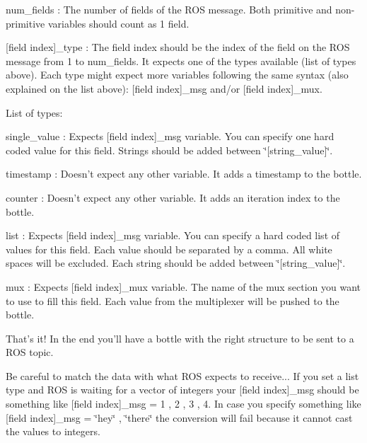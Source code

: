 {\ttfamily num\-\_\-fields} \-: The number of fields of the R\-O\-S message. Both primitive and non-\/primitive variables should count as 1 field.

{\ttfamily \mbox{[}field index\mbox{]}\-\_\-type} \-: The field index should be the index of the field on the R\-O\-S message from 1 to {\ttfamily num\-\_\-fields}. It expects one of the types available (list of types above). Each type might expect more variables following the same syntax (also explained on the list above)\-: {\ttfamily \mbox{[}field index\mbox{]}\-\_\-msg} and/or {\ttfamily \mbox{[}field index\mbox{]}\-\_\-mux}.

List of types\-:


\begin{DoxyItemize}
\item {\ttfamily single\-\_\-value} \-: Expects {\ttfamily \mbox{[}field index\mbox{]}\-\_\-msg} variable. You can specify one hard coded value for this field. Strings should be added between {\ttfamily \char`\"{}\mbox{[}string\-\_\-value\mbox{]}\char`\"{}}.
\item {\ttfamily timestamp} \-: Doesn't expect any other variable. It adds a timestamp to the bottle.
\item {\ttfamily counter} \-: Doesn't expect any other variable. It adds an iteration index to the bottle.
\item {\ttfamily list} \-: Expects {\ttfamily \mbox{[}field index\mbox{]}\-\_\-msg} variable. You can specify a hard coded list of values for this field. Each value should be separated by a comma. All white spaces will be excluded. Each string should be added between {\ttfamily \char`\"{}\mbox{[}string\-\_\-value\mbox{]}\char`\"{}}.
\item {\ttfamily mux} \-: Expects {\ttfamily \mbox{[}field index\mbox{]}\-\_\-mux} variable. The name of the mux section you want to use to fill this field. Each value from the multiplexer will be pushed to the bottle.
\end{DoxyItemize}

That's it! In the end you'll have a bottle with the right structure to be sent to a R\-O\-S topic.

Be careful to match the data with what R\-O\-S expects to receive... If you set a {\ttfamily list} type and R\-O\-S is waiting for a vector of integers your {\ttfamily \mbox{[}field index\mbox{]}\-\_\-msg} should be something like {\ttfamily \mbox{[}field index\mbox{]}\-\_\-msg = 1 , 2 , 3 , 4}. In case you specify something like {\ttfamily \mbox{[}field index\mbox{]}\-\_\-msg = \char`\"{}hey\char`\"{} , \char`\"{}there\char`\"{}} the conversion will fail because it cannot cast the values to integers.

